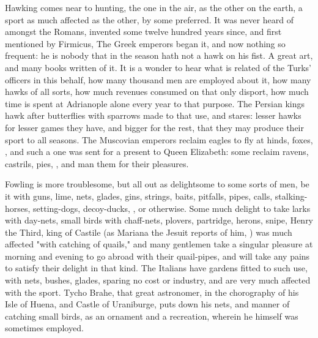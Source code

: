 {Hawking comes near to hunting, the one in the air, as the other on the earth, a sport as much affected as the other, by some preferred. It was never heard of amongst the Romans, invented some twelve hundred years since, and first mentioned by Firmicus,  The Greek emperors began it, and now nothing so frequent: he is nobody that in the season hath not a hawk on his fist. A great art, and many books written of it. It is a wonder to hear what is related of the Turks' officers in this behalf, how many thousand men are employed about it, how many hawks of all sorts, how much revenues consumed on that only disport, how much time is spent at Adrianople alone every year to that purpose. The Persian kings hawk after butterflies with sparrows made to that use, and stares: lesser hawks for lesser games they have, and bigger for the rest, that they may produce their sport to all seasons. The Muscovian emperors reclaim eagles to fly at hinds, foxes, \etc{}, and such a one was sent for a present to Queen Elizabeth: some reclaim ravens, castrils, pies, \etc{}, and man them for their pleasures.

Fowling is more troublesome, but all out as delightsome to some sorts of men, be it with guns, lime, nets, glades, gins, strings, baits, pitfalls, pipes, calls, stalking-horses, setting-dogs, decoy-ducks, \etc{}, or otherwise. Some much delight to take larks with day-nets, small birds with chaff-nets, plovers, partridge, herons, snipe, \etc{} Henry the Third, king of Castile (as Mariana the Jesuit reports of him, ) was much affected "with catching of quails," and many gentlemen take a singular pleasure at morning and evening to go abroad with their quail-pipes, and will take any pains to satisfy their delight in that kind. The Italians have gardens fitted to such use, with nets, bushes, glades, sparing no cost or industry, and are very much affected with the sport. Tycho Brahe, that great astronomer, in the chorography of his Isle of Huena, and Castle of Uraniburge, puts down his nets, and manner of catching small birds, as an ornament and a recreation, wherein he himself was sometimes employed.

}
